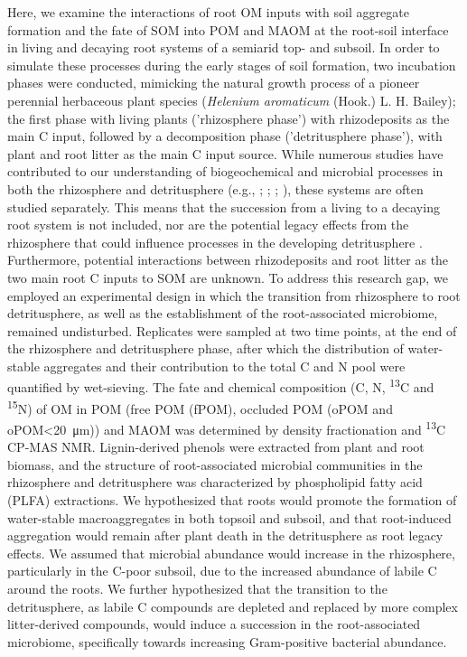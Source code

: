 Here, we examine the interactions of root OM inputs with soil aggregate formation and the fate of SOM into POM and MAOM at the root-soil interface in living and decaying root systems of a semiarid top- and subsoil. In order to simulate these processes during the early stages of soil formation, two incubation phases were conducted, mimicking the natural growth process of a pioneer perennial herbaceous plant species (\textit{Helenium aromaticum} (Hook.) L. H. Bailey); the first phase with living plants ('rhizosphere phase') with rhizodeposits as the main C input, followed by a decomposition phase ('detritusphere phase'), with plant and root litter as the main C input source. While numerous studies have contributed to our understanding of biogeochemical and microbial processes in both the rhizosphere and detritusphere (e.g., \citep{Poll2008}; \citep{Marschner2012}; \citep{Tian2013}; \citep{Vidal2021}), these systems are often studied separately. This means that the succession from a living to a decaying root system is not included, nor are the potential legacy effects from the rhizosphere that could influence processes in the developing detritusphere \citep{Wurst2015}. Furthermore, potential interactions between rhizodeposits and root litter as the two main root C inputs to SOM are unknown. To address this research gap, we employed an experimental design in which the transition from rhizosphere to root detritusphere, as well as the establishment of the root-associated microbiome, remained undisturbed. Replicates were sampled at two time points, at the end of the rhizosphere and detritusphere phase, after which the distribution of water-stable aggregates and their contribution to the total C and N pool were quantified by wet-sieving. The fate and chemical composition (C, N, \textsuperscript{13}C and \textsuperscript{15}N) of OM in POM (free POM (fPOM), occluded POM (oPOM and oPOM<\SI{20}{\micro\metre})) and MAOM was determined by density fractionation and \textsuperscript{13}C CP-MAS NMR. Lignin-derived phenols were extracted from plant and root biomass, and the structure of root-associated microbial communities in the rhizosphere and detritusphere was characterized by phospholipid fatty acid (PLFA) extractions. We hypothesized that roots would promote the formation of water-stable macroaggregates in both topsoil and subsoil, and that root-induced aggregation would remain after plant death in the detritusphere as root legacy effects. We assumed that microbial abundance would increase in the rhizosphere, particularly in the C-poor subsoil, due to the increased abundance of labile C around the roots. We further hypothesized that the transition to the detritusphere, as labile C compounds are depleted and replaced by more complex litter-derived compounds, would induce a succession in the root-associated microbiome, specifically towards increasing Gram-positive bacterial abundance.

